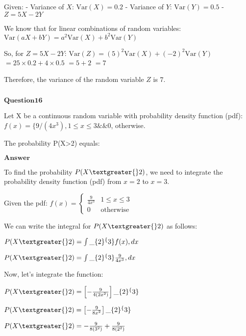 \documentclass[11pt]{article}
\makeatletter
\newcommand{\boxspacing}{\kern\kvtcb@left@rule\kern\kvtcb@boxsep}
\newcommand{\prompt}[4]{
        {\ttfamily\llap{{\color{#2}[#3]:\hspace{3pt}#4}}\vspace{-\baselineskip}}
    }
\makeatother
\begin{document}
Given: - Variance of $ X $: $ \text{Var}(X) = 0.2 $ - Variance of $
Y $: $ \text{Var}(Y) = 0.5 $ - $ Z = 5X - 2Y $

We know that for linear combinations of random variables: $
\text{Var}(aX + bY) = a^2 \text{Var}(X) + b^2 \text{Var}(Y) $

So, for $ Z = 5X - 2Y $: $ \text{Var}(Z) = (5)^2 \text{Var}(X) +
(-2)^2 \text{Var}(Y) $ $ = 25 \times 0.2 + 4 \times 0.5 $ $ = 5 +
2 $ $ = 7 $

Therefore, the variance of the random variable $ Z $ is $ 7 $.

    \begin{tcolorbox}[breakable, size=fbox, boxrule=1pt, pad at break*=1mm,colback=cellbackground, colframe=cellborder]
\prompt{In}{incolor}{ }{\boxspacing}
\begin{Verbatim}[commandchars=\\\{\}]

\end{Verbatim}
\end{tcolorbox}

    $\textbf{Question16}$

Let X be a continuous random variable with probability density function
(pdf): $f(x)=\{9/(4x^3) , 1 \leq x \leq 3 \&\& 0$, otherwise.

The probability P(X\textgreater2) equals:

$\textbf{Answer}$

    To find the probability $ P(X \textgreater{} 2) $, we need to
integrate the probability density function (pdf) from $ x = 2 $ to $
x = 3 $.

Given the pdf: $ f(x) =\begin{cases} \frac{9}{4x^3} & 1 \leq x \leq 3 \\ 0 & \text{otherwise} \end{cases}$

We can write the integral for $ P(X \textgreater{} 2) $ as follows:

$ P(X \textgreater{} 2) = \int\_\{2\}^\{3\} f(x) , dx $

$ P(X \textgreater{} 2) = \int\_\{2\}^\{3\} \frac{9}{4x^3} , dx $

Now, let's integrate the function:

$ P(X \textgreater{} 2) =
\left[ -\frac{9}{4(2x^2)} \right]\_\{2\}^\{3\} $

$ P(X \textgreater{} 2) =
\left[ -\frac{9}{8x^2} \right]\_\{2\}^\{3\} $

$ P(X \textgreater{} 2) = -\frac{9}{8(3^2)} + \frac{9}{8(2^2)} $
\end{document}
